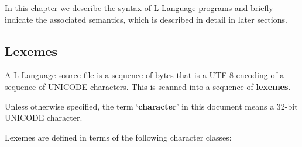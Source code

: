 \documentclass[12pt]{article}
\newcommand{\key}[1]{{\rm \bfseries #1}}
\newcommand{\skey}[2]{{\rm \bfseries #1#2}}
\begin{document}
In this chapter we describe the syntax of L-Language programs
and briefly indicate the associated semantics, which is
described in detail in later sections.

\subsection{Lexemes}
\label{LEXEMES}

A L-Language source file is a sequence of bytes that is a UTF-8 encoding
of a sequence of UNICODE characters.  This is scanned into a sequence
of \skey{lexeme}s.

Unless otherwise specified, the term `\key{character}' in this
document means a 32-bit UNICODE character.

Lexemes are defined in terms of
the following character classes:
\end{document}
